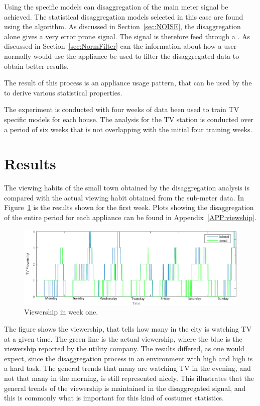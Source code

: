 Using the specific models can disaggregation of the main meter signal be achieved. The statistical disaggregation models selected in this case are found using the  algorithm. As discussed in Section~\ref{sec:NOISE}, the disaggregation alone gives a very error prone signal. The signal is therefore feed through a . As discussed in Section~\ref{sec:NormFilter} can the information about how a user normally would use the appliance be used to filter the disaggregated data to obtain better results. 

The result of this process is an appliance usage pattern, that can be used by the  to derive various statistical properties.  

The experiment is conducted with four weeks of data been used to train TV specific models for each house. The analysis for the TV station is conducted over a period of six weeks that is not overlapping with the initial four training weeks. 

\section{Results}
The viewing habits of the small town obtained by the disaggregation analysis is compared with the actual viewing habit obtained from the sub-meter data. In Figure~\ref{fig:WHW} is the results shown for the first week. Plots showing the disaggregation of the entire period for each appliance can be found in Appendix~\ref{APP:viewship}.

\begin{figure}[H]
\centering
\includegraphics[width=1\textwidth]{billeder/Viewership.png}
\caption{Viewership in week one.}
\label{fig:WHW}
\end{figure}

The figure shows the viewership, that tells how many in the city is watching TV at a given time. The green line is the actual viewership, where the blue is the viewership reported by the utility company. The results differed, as one would expect, since the disaggregation process in an environment with high  and high  is a hard task. The general trends that many are watching TV in the evening, and not that many in the morning, is still represented nicely. This illustrates that the general trends of the viewership is maintained in the disaggregated signal, and this is commonly what is important for this kind of costumer statistics. 

